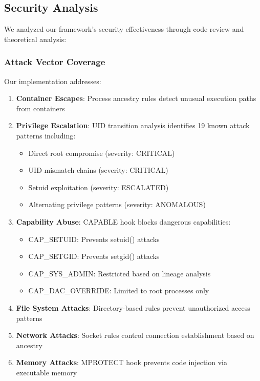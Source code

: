 \documentclass[]{sn-jnl}
\begin{document}
\subsection{Security Analysis}

We analyzed our framework's security effectiveness through code review and
theoretical analysis:

\subsubsection{Attack Vector Coverage}

Our implementation addresses:
\begin{enumerate}
\item \textbf{Container Escapes}: Process ancestry rules detect unusual execution
      paths from containers
\item \textbf{Privilege Escalation}: UID transition analysis identifies 19 known
      attack patterns including:
   \begin{itemize}
   \item Direct root compromise (severity: CRITICAL)
   \item UID mismatch chains (severity: CRITICAL)
   \item Setuid exploitation (severity: ESCALATED)
   \item Alternating privilege patterns (severity: ANOMALOUS)
   \end{itemize}
\item \textbf{Capability Abuse}: CAPABLE hook blocks dangerous capabilities:
   \begin{itemize}
   \item CAP\_SETUID: Prevents setuid() attacks
   \item CAP\_SETGID: Prevents setgid() attacks
   \item CAP\_SYS\_ADMIN: Restricted based on lineage analysis
   \item CAP\_DAC\_OVERRIDE: Limited to root processes only
   \end{itemize}
\item \textbf{File System Attacks}: Directory-based rules prevent unauthorized
      access patterns
\item \textbf{Network Attacks}: Socket rules control connection establishment
      based on ancestry
\item \textbf{Memory Attacks}: MPROTECT hook prevents code injection via
      executable memory
\end{enumerate}
\end{document}
